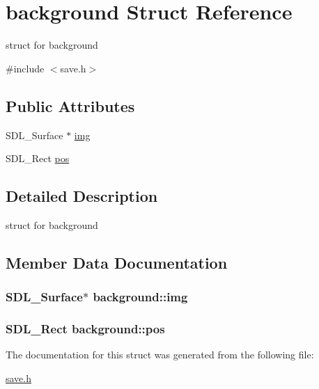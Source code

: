 \hypertarget{structbackground}{}\section{background Struct Reference}
\label{structbackground}


struct for background  




{\ttfamily \#include $<$save.\+h$>$}

\subsection*{Public Attributes}
\begin{DoxyCompactItemize}
\item 
S\+D\+L\+\_\+\+Surface $\ast$ \hyperlink{structbackground_a1c5c3a3ebb56924b9f829602f9641006}{img}
\item 
S\+D\+L\+\_\+\+Rect \hyperlink{structbackground_aa70f1467505f43c50fec228c21bd7af4}{pos}
\end{DoxyCompactItemize}


\subsection{Detailed Description}
struct for background 

\subsection{Member Data Documentation}
\subsubsection[{\texorpdfstring{img}{img}}]{\setlength{\rightskip}{0pt plus 5cm}S\+D\+L\+\_\+\+Surface$\ast$ background\+::img}\hypertarget{structbackground_a1c5c3a3ebb56924b9f829602f9641006}{}\label{structbackground_a1c5c3a3ebb56924b9f829602f9641006}
\subsubsection[{\texorpdfstring{pos}{pos}}]{\setlength{\rightskip}{0pt plus 5cm}S\+D\+L\+\_\+\+Rect background\+::pos}\hypertarget{structbackground_aa70f1467505f43c50fec228c21bd7af4}{}\label{structbackground_aa70f1467505f43c50fec228c21bd7af4}


The documentation for this struct was generated from the following file\+:\begin{DoxyCompactItemize}
\item 
\hyperlink{save_8h}{save.\+h}\end{DoxyCompactItemize}
